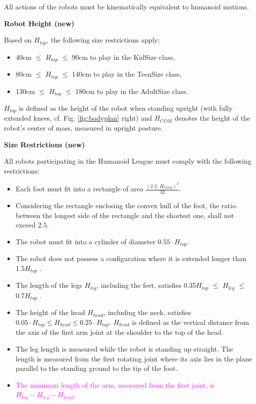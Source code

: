 \bigskip

All actions of the robots must be kinematically equivalent to humanoid motions.

\bigskip

{\bfseries Robot Height (new)}

\headlinebox

Based on $H_{top}$, the following size restrictions apply:

\begin{itemize}
\item 40cm ${\leq}$ $H_{top}$ ${\leq}$ 90cm to play in the KidSize class, 
\item 80cm ${\leq}$ $H_{top}$ ${\leq}$ 140cm to play in the TeenSize class,
\item 130cm ${\leq}$ $H_{top}$ ${\leq}$ 180cm to play in the AdultSize class.
\end{itemize}

$H_{top}$ is defined as the height of the robot when standing upright (with fully extended knees, cf. Fig. \ref{fig:bodyplan} right) and $H_{COM}$ denotes the height of the robot's center of mass, measured in upright posture.

\bigskip

{\bfseries Size Restrictions (new)}

\headlinebox

All robots participating in the Humanoid League must comply with the following restrictions:

\begin{itemize}
\item Each foot must fit into a rectangle of area $\frac{(2.2 \cdot H_{COM})^2}{32}$. 
\item Considering the rectangle enclosing the convex hull of the foot, the ratio between the longest side of the rectangle and the shortest one, shall not exceed $2.5$.
\item The robot must fit into a cylinder of diameter $0.55 \cdot H_{top}$.
\item The robot does not possess a configuration where it is extended longer than 1.5{\textperiodcentered}$H_{top}$ .
\item The length of the legs $H_{leg}$, including the feet, satisfies 0.35{\textperiodcentered}$H_{top}$ ${\leq}$ $H_{leg}$ ${\leq}$ 0.7{\textperiodcentered}$H_{top}$ .
\item The height of the head $H_{head}$, including the neck, satisfies $0.05 \cdot H_{top} \leq H_{head} \leq 0.25 \cdot H_{top}$. $H_{head}$ is defined as the vertical distance from the axis of the first arm joint at the shoulder to the top of the head.
\item The leg length is measured while the robot is standing up straight. The length is measured from the first rotating joint where its axis lies in the plane parallel to the standing ground to the tip of the foot.
\item \textcolor{magenta}{The minimum length of the arm, measured from the first joint, is $H_{top} - H_{leg} - H_{head}$.}
\end{itemize}



